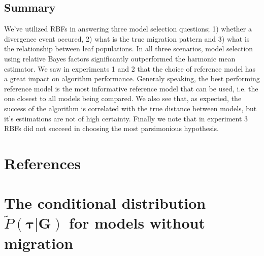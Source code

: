 \documentclass[11pt]{article}
\newcommand{\vect}[1]{\boldsymbol{\mathbf{#1}}}
\newcommand{\Tr}{\mathcal{T}}
\newcommand{\G}{\vect{G}}
\newcommand{\Pref}{\widetilde{P}}
\newcommand{\1}{\mathbbm{1}}
\newcommand{\taus}{\vect\tau}
\begin{document}
\subsection{Summary}

We've utilized RBFs in answering three model selection questions; 1) whether a divergence event occured, 2) what is the true migration pattern and 3) what is the relationship between leaf populations. In all three scenarios, model selection using relative Bayes factors significantly outperformed the harmonic mean estimator.
%
We saw in experiments 1 and 2 that the choice of reference model has a great impact on algorithm performance. Generaly speaking, the best performing reference model is the most informative reference model that can be used, i.e. the one closest to all models being compared. 
%
We also see that, as expected, the success of the algorithm is correlated with the true distance between models, but it's estimations are not of high certainty.
%
Finally we note that in experiment 3 RBFs did not succeed in choosing the most parsimonious hypothesis.


\newpage

\newpage

\section{References}
\renewcommand*{\refname}{ }





\newpage


\appendix
\newcommand{\anc}{\geq_\Tr}
\newcommand{\nanc}{\ngeq_\Tr}

\section{\texorpdfstring{The conditional distribution $\Pref(\taus|\G)$ for models without migration}{Conditional distribution without migration}}\label{ap:cond_nomig}
\end{document}
